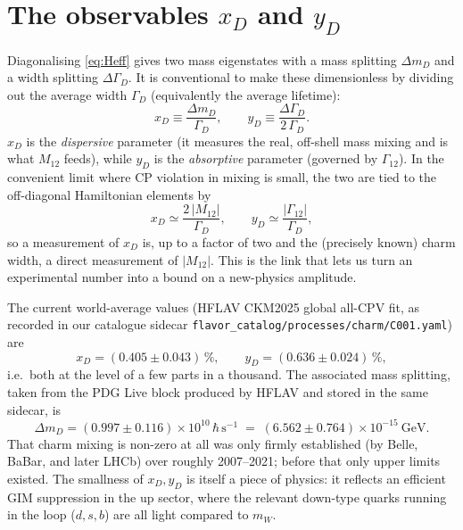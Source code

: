 \documentclass[11pt]{article}
\newcommand{\code}[1]{\texttt{#1}}
\newcommand{\xD}{x_D}
\newcommand{\yD}{y_D}
\newcommand{\Mtwelve}{M_{12}}
\newcommand{\dmD}{\Delta m_D}
\theoremstyle{definition}
\begin{document}
\section{The observables $\xD$ and $\yD$}
\label{sec:xy}

Diagonalising \eqref{eq:Heff} gives two mass eigenstates with a mass splitting
$\dmD$ and a width splitting $\Delta\Gamma_D$. It is conventional to make these
dimensionless by dividing out the average width $\Gamma_D$ (equivalently the
average lifetime):
\begin{equation}
\xD \equiv \frac{\dmD}{\Gamma_D}, \qquad
\yD \equiv \frac{\Delta\Gamma_D}{2\,\Gamma_D}.
\label{eq:xydef}
\end{equation}
$\xD$ is the \emph{dispersive} parameter (it measures the real, off-shell mass
mixing and is what $\Mtwelve$ feeds), while $\yD$ is the \emph{absorptive}
parameter (governed by $\Gamma_{12}$). In the convenient limit where
CP violation in mixing is small, the two are tied to the off-diagonal
Hamiltonian elements by
\begin{equation}
\xD \simeq \frac{2\,|\Mtwelve|}{\Gamma_D}, \qquad
\yD \simeq \frac{|\Gamma_{12}|}{\Gamma_D},
\label{eq:xy_m12}
\end{equation}
so a measurement of $\xD$ is, up to a factor of two and the (precisely known)
charm width, a direct measurement of $|\Mtwelve|$. This is the link that lets us
turn an experimental number into a bound on a new-physics amplitude.

The current world-average values (HFLAV CKM2025 global all-CPV fit, as recorded
in our catalogue sidecar \code{flavor\_catalog/processes/charm/C001.yaml}) are
\begin{equation}
\xD = (0.405 \pm 0.043)\,\%, \qquad
\yD = (0.636 \pm 0.024)\,\%,
\label{eq:xyval}
\end{equation}
i.e.\ both at the level of a few parts in a thousand. The associated mass
splitting, taken from the PDG Live block produced by HFLAV and stored in the
same sidecar, is
\begin{equation}
\dmD = (0.997 \pm 0.116)\times10^{10}\,\hbar\,\mathrm{s}^{-1}
\;=\; (6.562 \pm 0.764)\times10^{-15}\ \mathrm{GeV}.
\label{eq:dmDval}
\end{equation}
That charm mixing is non-zero at all was only firmly established (by Belle,
BaBar, and later LHCb) over roughly 2007--2021; before that only upper limits
existed. The smallness of $\xD,\yD$ is itself a piece of physics: it reflects an
efficient GIM suppression in the up sector, where the relevant down-type quarks
running in the loop ($d,s,b$) are all light compared to $m_W$.
\end{document}
